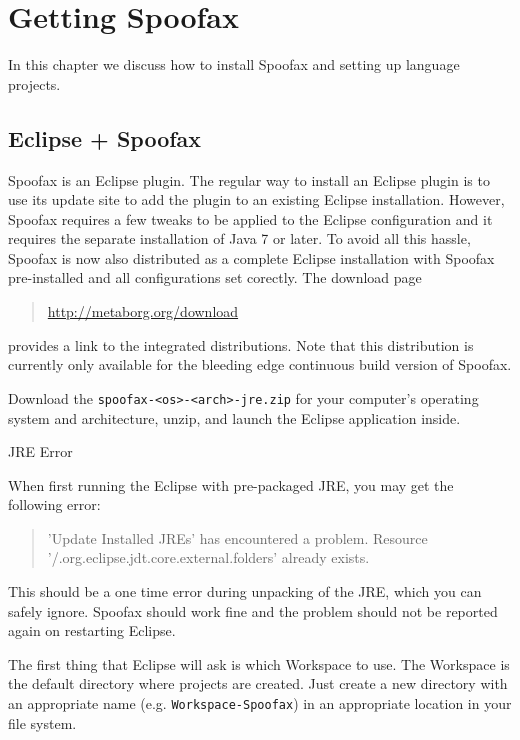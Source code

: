 \chapter{Getting Spoofax}

In this chapter we discuss how to install Spoofax and setting up language
projects.

\section{Eclipse + Spoofax}

Spoofax is an Eclipse plugin. The regular way to install an Eclipse
plugin is to use its update site to add the plugin to an existing Eclipse
installation. However, Spoofax requires a few tweaks to be applied to the
Eclipse configuration and it requires the separate installation of Java 7 or
later. To avoid all this hassle, Spoofax is now also distributed as a
complete Eclipse installation with Spoofax pre-installed and all configurations
set corectly. The download page

\begin{quote}
  \url{http://metaborg.org/download}
\end{quote}

\noindent
provides a link to the integrated distributions. Note that this distribution is
currently only available for the bleeding edge continuous build version of
Spoofax. 

Download the \texttt{spoofax-<os>-<arch>-jre.zip} for your computer's operating
 system and architecture, unzip, and launch the Eclipse application inside.

\begin{sidenote}{JRE Error}

When first running the Eclipse with pre-packaged JRE, you may get the following
error:

\begin{quote}
'Update Installed JREs' has encountered a problem.
Resource '/.org.eclipse.jdt.core.external.folders' already exists.
\end{quote} 

\noindent This should be a one time error during unpacking of the JRE, which you
can safely ignore. Spoofax should work fine and the problem should not be
reported again on restarting Eclipse.

\end{sidenote} 

The first thing that Eclipse will ask is which Workspace to use. The Workspace
is the default directory where projects are created. Just create a new directory
with an appropriate name (e.g. \texttt{Workspace-Spoofax}) in an appropriate
location in your file system.

